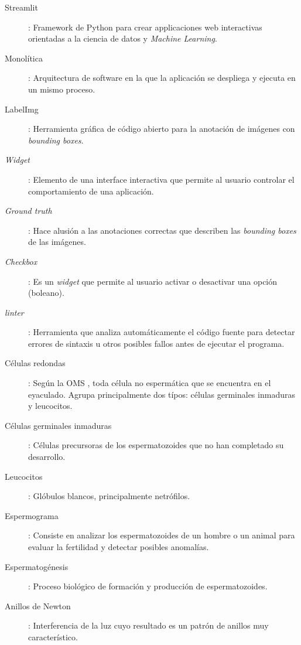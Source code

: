 \documentclass[12pt,a4paper,onecolumn,oneside]{report}
\begin{document}
\begin{description}
  \item[Streamlit]: Framework de Python para crear applicaciones web interactivas orientadas a la ciencia de datos y \textit{Machine Learning}.
  \item[Monolítica]: Arquitectura de software en la que la aplicación se despliega y ejecuta en un mismo proceso.     
  \item[LabelImg]: Herramienta gráfica de código abierto para la anotación de imágenes con \textit{bounding boxes}.
  \item[\textit{Widget}]: Elemento de una interface interactiva que permite al usuario controlar el comportamiento de una aplicación.
  \item[\textit{Ground truth}]: Hace alusión a las anotaciones correctas que describen las \textit{bounding boxes} de las imágenes.
  \item[\textit{Checkbox}]: Es un \textit{widget} que permite al usuario activar o desactivar una opción (boleano).  
  \item[\textit{linter}]:  Herramienta que analiza automáticamente el código fuente para detectar errores de sintaxis u otros posibles fallos antes de ejecutar el programa. 
  \item[Células redondas]: Según la OMS \cite{OMS}, toda célula no espermática que se encuentra en el eyaculado. Agrupa principalmente dos típos: células germinales inmaduras y leucocitos.
  \item[Células germinales inmaduras]: Células precursoras de los espermatozoides que no han completado su desarrollo.
  \item[Leucocitos]: Glóbulos blancos, principalmente netrófilos.  
  \item[Espermograma]: Consiste en analizar los espermatozoides de un hombre o un animal para evaluar la fertilidad y detectar posibles anomalías. 
  \item[Espermatogénesis]: Proceso biológico de formación y producción de espermatozoides. 
  \item[Anillos de Newton]: Interferencia de la luz cuyo resultado es un patrón de anillos muy característico.
\end{description} 

\newpage
\renewcommand{\thepage}{\arabic{page}}
\setcounter{page}{1} %
\end{document}
